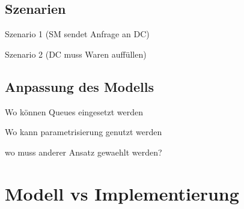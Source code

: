 \subsection{Szenarien}
Szenario 1 (SM sendet Anfrage an DC)

Szenario 2 (DC muss Waren auffüllen)
\subsection{Anpassung des Modells}
Wo können Queues eingesetzt werden

Wo kann parametrisierung genutzt werden

wo muss anderer Ansatz gewaehlt werden?

\section{Modell vs Implementierung}


